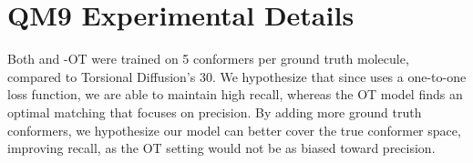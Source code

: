 \section{QM9 Experimental Details}
\label{section:appendix-qm9}
\vspace{-1ex}

Both \model and \modelns-OT were trained on 5 conformers per ground truth molecule, compared to Torsional Diffusion's 30. We hypothesize that since \model uses a one-to-one loss function, we are able to maintain high recall, whereas the OT model finds an optimal matching that focuses on precision. By adding more ground truth conformers, we hypothesize our model can better cover the true conformer space, improving recall, as the OT setting would not be as biased toward precision. 

